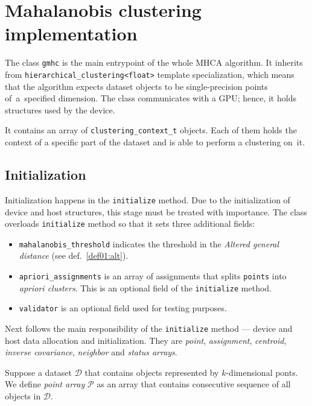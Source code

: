 \section{Mahalanobis clustering implementation}

The class \texttt{gmhc} is the main entrypoint of the whole MHCA algorithm. It inherits from \texttt{hierarchical\_clustering<float>} template specialization, which means that the algorithm expects dataset objects to be single-precision points of~a~specified dimension. The class communicates
with a GPU; hence, it holds structures used by the device.

It contains an array of \texttt{clustering\_context\_t} objects. Each of them holds the context of a specific part of the dataset and is able to perform a clustering on~it.

\subsection{Initialization}

Initialization happens in the \texttt{initialize} method. Due to the initialization of device and host structures, this stage must be treated with importance.
The class overloads \texttt{initialize} method so that it sets three additional fields:
\begin{itemize}
	\item \texttt{mahalanobis\_threshold} indicates the threshold in the \emph{Altered general distance} (see def.~\ref{def01:alt}).
	
	\item\texttt{apriori\_assignments}  is an array of assignments that splits \texttt{points} into \emph{apriori clusters}. This is an optional field of the \texttt{initialize} method.
	
	\item \texttt{validator} is an optional field used for testing purposes.
\end{itemize}

Next follows the main responsibility of the \texttt{initialize} method --- device and host data allocation and initialization. They are \emph{point}, \emph{assignment}, \emph{centroid}, \emph{inverse covariance}, \emph{neighbor} and \emph{status arrays}.

\begin{defn}
	Suppose a dataset $\mathcal{D}$ that contains objects represented by $k$-di\-men\-si\-onal ponts. We define \emph{point array} $\mathcal{P}$ as an array that contains consecutive sequence of all objects in $\mathcal{D}$.
	\label{def03:point}
\end{defn}

